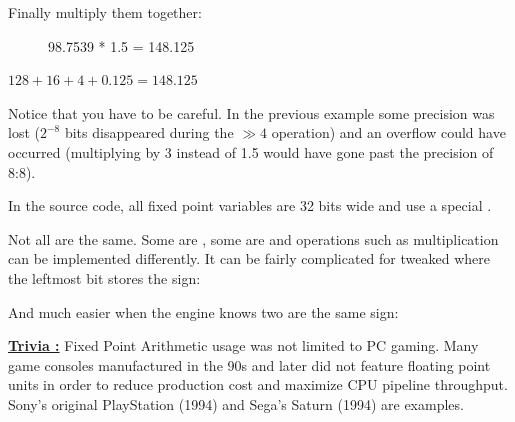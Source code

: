 Finally multiply them together:

\begin{figure}[H]
 \centering
   
   \caption{98.7539 * 1.5 = 148.125} 
\end{figure} 
$128 + 16 + 4 + 0.125 = 148.125 $\\
\par
Notice that you have to be careful. In the previous example some precision was lost ($ 2^{-8}$ bits disappeared during the $\gg 4$ operation) and an overflow could have occurred (multiplying by 3 instead of 1.5 would have gone past the precision of 8:8).\\
\par
In the source code, all fixed point variables are 32 bits wide and use a special .\\
\par
\begin{minipage}{\textwidth}
 
 \end{minipage}
\par
Not all  are the same. Some are , some are  and operations such as multiplication can be implemented differently. It can be fairly complicated for tweaked  where the leftmost bit stores the sign:\\
\par
\begin{minipage}{\textwidth}
 
 \end{minipage}
\par
And much easier when the engine knows two  are the same sign:\\

\par
\begin{minipage}{\textwidth}
 
 \end{minipage}
\par

 \textbf{\underline{Trivia :}}  Fixed Point Arithmetic usage was not limited to PC gaming. Many game consoles manufactured in the 90s and later did not feature floating point units in order to reduce production cost and maximize CPU pipeline throughput. Sony's original PlayStation (1994) and Sega's Saturn (1994) are examples.
 

 
 


